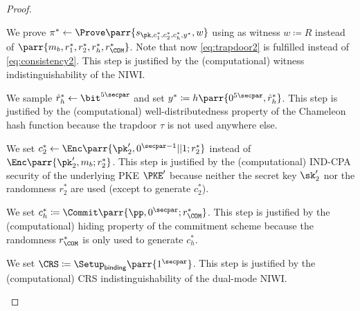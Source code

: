 \begin{proof}
\begin{hybrids}
        \item We prove \(\pi^* \gets \Prove\parr{s_{\pk,c^*_1,c^*_2,c^*_h,y^*},w}\) using as witness \(w \coloneqq R\) instead of \(\parr{m_b,r^*_1,r^*_2,r^*_h,r^*_\COM}\).
        Note that now \cref{eq:trapdoor2} is fulfilled instead of \cref{eq:consistency2}.
        This step is justified by the (computational) witness indistinguishability of the NIWI.

        \item We sample \(\hat{r}^*_h \gets \bit^{5\secpar}\) and set \(y^* \coloneqq h\parr{0^{5\secpar},\hat{r}^*_h}\).
        This step is justified by the (computational) well-distributedness property of the Chameleon hash function because the trapdoor \(\tau\) is not used anywhere else.

        \item We set \(c^*_2 \gets \Enc\parr{\pk'_2,0^{\secpar-1}||1;r^*_2}\) instead of \(\Enc\parr{\pk'_2,m_b;r^*_2}\).
        This step is justified by the (computational) IND-CPA security of the underlying PKE \(\PKE'\) because neither the secret key \(\sk'_2\) nor the randomness \(r^*_2\) are used (except to generate \(c^*_2\)).

        \item We set \(c^*_h \coloneqq \Commit\parr{\pp,0^\secpar;r^*_\COM}\).
        This step is justified by the (computational) hiding property of the commitment scheme because the randomness \(r^*_\COM\) is only used to generate \(c^*_h\).

        \item We set \(\CRS \coloneqq \Setup_{\textsf{binding}}\parr{1^\secpar}\).
        This step is justified by the (computational) CRS indistinguishability of the dual-mode NIWI.


\end{hybrids}
\end{proof}

